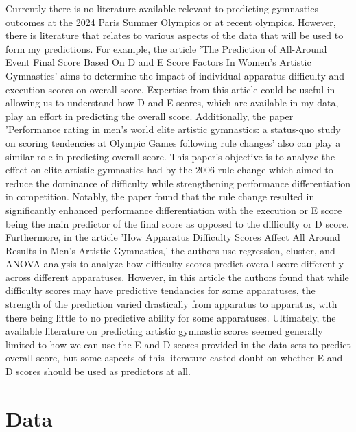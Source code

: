 \documentclass[12pt]{article}
\begin{document}
Currently there is no literature available relevant to predicting gymnastics outcomes at the 2024 
Paris Summer Olympics or at recent olympics. However, there is literature that relates to various aspects of 
the data that will be used to form my predictions. For example, the article 'The Prediction of All-Around 
Event Final Score Based On D and E Score Factors In Women's Artistic Gymnastics' aims to determine the 
impact of individual apparatus difficulty and execution scores on overall score. 
Expertise from this article could be useful in allowing us to understand how D and E scores, 
which are available in my data, play an effort in predicting the overall score. Additionally, the paper 
'Performance rating in men’s world elite artistic gymnastics: a status-quo study on scoring 
tendencies at Olympic Games following rule changes' also can play a similar role in predicting overall 
score. This paper's objective is to analyze the effect on elite artistic gymnastics had by the 2006 rule change 
which aimed to reduce the dominance of difficulty while strengthening performance differentiation in 
competition. Notably, the paper found that the rule change resulted in significantly enhanced performance 
differentiation with the execution or E score being the main predictor of the final score as opposed to 
the difficulty or D score. Furthermore, in the article 'How Apparatus Difficulty Scores Affect All 
Around Results in Men's Artistic Gymnastics,' the authors use regression, cluster, and ANOVA analysis to 
analyze how difficulty scores predict overall score differently across different apparatuses. However, in this 
article the authors found that while difficulty scores may have predictive tendancies for some apparatuses, 
the strength of the prediction varied drastically from apparatus to apparatus, with there being little to no 
predictive ability for some apparatuses. Ultimately, the available literature on predicting artistic 
gymnastic scores seemed generally limited to how we can use the E and D scores provided in the data sets 
to predict overall score, but some aspects of this literature casted doubt on whether E and D scores should be 
used as predictors at all.

\section{Data}
\label{sec:data}
\end{document}
